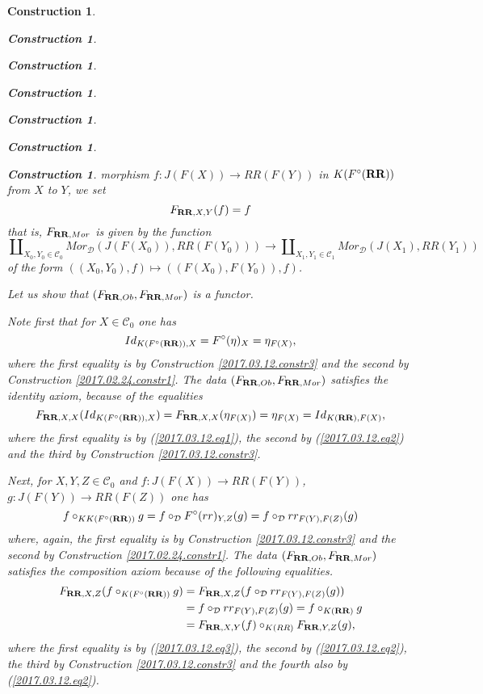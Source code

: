 \documentclass[onecolumn,12pt]{amsart}
\numberwithin{proposition}{subsection}
\newtheorem{construction}[proposition]{Construction}
\newcommand{\sr}{\rightarrow}
\newcommand{\RR}{{\bf RR}}
\newcommand{\C}{{\mathcal C}}
\newcommand{\D}{{\mathcal D}}
\begin{document}
\begin{construction}
\begin{construction}
\begin{construction}
\begin{construction}
\begin{construction}
\begin{construction}
\begin{construction}
morphism $f:J(F(X))\sr RR(F(Y))$ in $K(F^{\circ}(\RR))$ from $X$ to $Y$, we set
%
\begin{equation}
\label{2017.03.12.eq2}
F_{\RR,X,Y}(f)=f
\end{equation}%
%
that is, $F_{\RR,Mor}$ is given by the function
%
$$\amalg_{X_0,Y_0\in\C_0}Mor_{\D}(J(F(X_0)),RR(F(Y_0)))\sr \amalg_{X_1,Y_1\in\C_1}Mor_{\D}(J(X_1),RR(Y_1))$$
%
of the form $((X_0,Y_0),f)\mapsto ((F(X_0),F(Y_0)),f)$. 

Let us show that $(F_{\RR,Ob},F_{\RR,Mor})$ is a functor. 

Note first that for $X\in\C_0$ one has
%
\begin{equation}
\label{2017.03.12.eq1}
Id_{K(F^{\circ}(\RR)),X}=F^{\circ}(\eta)_{X}=\eta_{F(X)},
\end{equation}%
%
where the first equality is by Construction \ref{2017.03.12.constr3} and the
second by Construction \ref{2017.02.24.constr1}. The data
$(F_{\RR,Ob},F_{\RR,Mor})$ satisfies the identity axiom, because of the
equalities
%
$$F_{\RR,X,X}(Id_{K(F^{\circ}(\RR)),X})=F_{\RR,X,X}(\eta_{F(X)})=\eta_{F(X)}=Id_{K(\RR),F(X)},$$
%
where the first equality is by (\ref{2017.03.12.eq1}), the second by (\ref{2017.03.12.eq2}) and the third by Construction \ref{2017.03.12.constr3}. 

Next, for $X,Y,Z\in \C_0$ and $f:J(F(X))\sr RR(F(Y))$, $g:J(F(Y))\sr RR(F(Z))$ one has
%
\begin{equation}
\label{2017.03.12.eq3}
f\circ_{KK(F^{\circ}(\RR))} g= f\circ_{\D} F^{\circ}(rr)_{Y,Z}(g)=f\circ_{\D} rr_{F(Y),F(Z)}(g)
\end{equation}%
%
where, again, the first equality is by Construction \ref{2017.03.12.constr3}
and the second by Construction \ref{2017.02.24.constr1}. The data
$(F_{\RR,Ob},F_{\RR,Mor})$ satisfies the composition axiom because of the
following equalities.
%
\begin{equation*}
  \begin{split}
    F_{\RR,X,Z}(f\circ_{K(F^{\circ}(\RR))} g)&=F_{\RR,X,Z}(f\circ_{\D} rr_{F(Y),F(Z)}(g)) \\
    &=f\circ_{\D} rr_{F(Y),F(Z)}(g)=f\circ_{K(\RR)}g \\
    &=F_{\RR,X,Y}(f)\circ_{K(RR)}F_{\RR,Y,Z}(g),
  \end{split}
\end{equation*}
%
where the first equality is by (\ref{2017.03.12.eq3}), the second by (\ref{2017.03.12.eq2}), the third by Construction \ref{2017.03.12.constr3} and the fourth also by (\ref{2017.03.12.eq2}). 


\end{construction}
\end{construction}
\end{construction}
\end{construction}
\end{construction}
\end{construction}
\end{construction}
\end{document}
